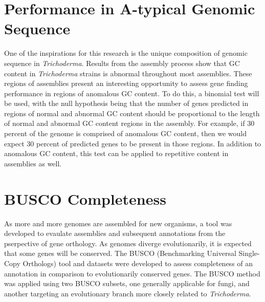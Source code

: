 \section{Performance in A-typical Genomic Sequence}

One of the inspirations for this research is the unique composition of
genomic sequence in \textit{Trichoderma}. Results from the assembly
process show that GC content in \textit{Trichoderma} strains is
abnormal throughout most assemblies. These regions of assemblies
present an interesting opportunity to assess gene finding performance
in regions of anomalous GC content. To do this, a binomial test will
be used, with the null hypothesis being that the number of genes
predicted in regions of normal and abnormal GC content should be
proportional to the length of normal and abnormal GC content regions
in the assembly. For example, if 30 percent of the genome is comprised
of anomalous GC content, then we would expect 30 percent of predicted
genes to be present in those regions. In addition to anomalous GC
content, this test can be applied to repetitive content in assemblies
as well.

\section{BUSCO Completeness}

As more and more genomes are assembled for new organisms, a tool was
developed to evaulate assemblies and subsequent annotations from the
pserpective of gene orthology. As genomes diverge evolutionarily, it
is expected that some genes will be conserved. The BUSCO (Benchmarking
Universal Single-Copy Orthologs) tool and datasets were developed to
assess completeness of an annotation in comparison to evolutionarily
conserved genes. The BUSCO method was applied using two BUSCO subsets,
one generally applicable for fungi, and another targeting an
evolutionary branch more closely related to \textit{Trichoderma}.
